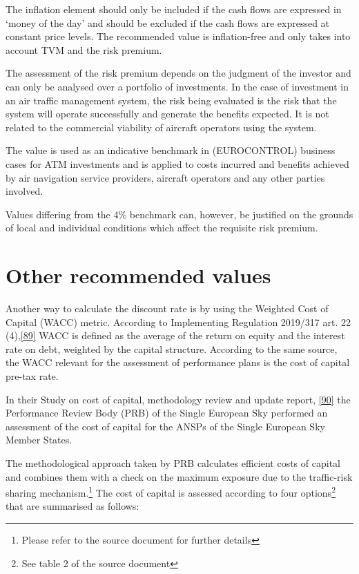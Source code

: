 \documentclass[
  11pt,
  a4paper,
]{book}
\begin{document}
The inflation element should only be included if the cash flows are
expressed in `money of the day' and should be excluded if the cash flows
are expressed at constant price levels. The recommended value is
inflation-free and only takes into account TVM and the risk premium.

The assessment of the risk premium depends on the judgment of the
investor and can only be analysed over a portfolio of investments. In
the case of investment in an air traffic management system, the risk
being evaluated is the risk that the system will operate successfully
and generate the benefits expected. It is not related to the commercial
viability of aircraft operators using the system.

The value is used as an indicative benchmark in (EUROCONTROL) business
cases for ATM investments and is applied to costs incurred and benefits
achieved by air navigation service providers, aircraft operators and any
other parties involved.

Values differing from the 4\% benchmark can, however, be justified on
the grounds of local and individual conditions which affect the
requisite risk premium.

\hypertarget{other-recommended-values}{%
\section{Other recommended values}\label{other-recommended-values}}

Another way to calculate the discount rate is by using the Weighted Cost
of Capital (WACC) metric. According to Implementing Regulation 2019/317
art. 22 (4),\protect\hyperlink{ref-ir2019317}{{[}89{]}} WACC is defined
as the average of the return on equity and the interest rate on debt,
weighted by the capital structure. According to the same source, the
WACC relevant for the assessment of performance plans is the cost of
capital pre-tax rate.

In their Study on cost of capital, methodology review and update report,
\protect\hyperlink{ref-prb2021}{{[}90{]}} the Performance Review Body
(PRB) of the Single European Sky performed an assessment of the cost of
capital for the ANSPs of the Single European Sky Member States.

The methodological approach taken by PRB calculates efficient costs of
capital and combines them with a check on the maximum exposure due to
the traffic-risk sharing mechanism.\footnote{Please refer to the source
  document for further details} The cost of capital is assessed
according to four options\footnote{See table 2 of the source document}\\
that are summarised as follows:
\end{document}
